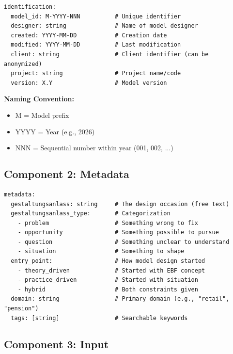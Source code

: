 \begin{tcolorbox}[colback=blue!5!white, colframe=blue!75!black,
    title=Schema: Identification]
\begin{verbatim}
identification:
  model_id: M-YYYY-NNN          # Unique identifier
  designer: string              # Name of model designer
  created: YYYY-MM-DD           # Creation date
  modified: YYYY-MM-DD          # Last modification
  client: string                # Client identifier (can be anonymized)
  project: string               # Project name/code
  version: X.Y                  # Model version
\end{verbatim}

\textbf{Naming Convention:}
\begin{itemize}[nosep]
\item M = Model prefix
\item YYYY = Year (e.g., 2026)
\item NNN = Sequential number within year (001, 002, ...)
\end{itemize}
\end{tcolorbox}

\subsection{Component 2: Metadata}

\begin{tcolorbox}[colback=green!5!white, colframe=green!75!black,
    title=Schema: Metadata]
\begin{verbatim}
metadata:
  gestaltungsanlass: string     # The design occasion (free text)
  gestaltungsanlass_type:       # Categorization
    - problem                   # Something wrong to fix
    - opportunity               # Something possible to pursue
    - question                  # Something unclear to understand
    - situation                 # Something to shape
  entry_point:                  # How model design started
    - theory_driven             # Started with EBF concept
    - practice_driven           # Started with situation
    - hybrid                    # Both constraints given
  domain: string                # Primary domain (e.g., "retail", "pension")
  tags: [string]                # Searchable keywords
\end{verbatim}
\end{tcolorbox}

\subsection{Component 3: Input}

